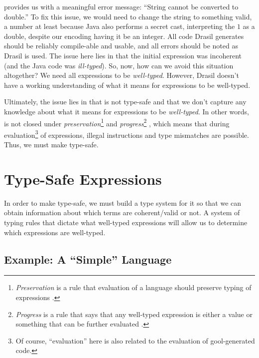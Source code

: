 \pseudoExampleLandPosQDBadTypingJavaCode{}

\pseudoExampleLandPosQDBadTypingJavaCodeCompErr{}

 provides us with a
meaningful error message: ``String cannot be converted to double.'' To fix this
issue, we would need to change the string to something valid, a number at least
because Java also performs a secret cast, interpreting the \(1\) as a double,
despite our encoding having it be an integer. All code Drasil generates should
be reliably compile-able and usable, and all errors should be noted as Drasil is
used. The issue here lies in that the initial expression was incoherent (and the
Java code was \textit{ill-typed}). So, now, how can we avoid this situation
altogether? We need all expressions to be \textit{well-typed}. However, Drasil
doesn't have a working understanding of what it means for expressions to be
well-typed.

Ultimately, the issue lies in that \Expr{} is not type-safe \cite{Harper2016}
and that we don't capture any knowledge about what it means for expressions to
be \textit{well-typed}. In other words, \Expr{} is not closed under
\textit{preservation}\footnote{\textit{Preservation} is a rule that evaluation
of a language should preserve typing of expressions \cite{Harper2016}.} and
\textit{progress}\footnote{\textit{Progress} is a rule that says that any
well-typed expression is either a value or something that can be further
evaluated \cite{Harper2016}.} \cite{Harper2016}, which means that during
evaluation\footnote{Of course, ``evaluation'' here is also related to the
evaluation of \acs{gool}-generated code.} of expressions, illegal instructions
and type mismatches are possible. Thus, we must make \Expr{} type-safe.

\section{Type-Safe Expressions}
\label{chap:typed-expr:sec:type-safe-expressions}

In order to make \Expr{} type-safe, we must build a type system for it so that
we can obtain information about which \Expr{} terms are coherent/valid or not. A
system of typing rules that dictate what well-typed expressions will allow us to
determine which expressions are well-typed.

\subsection{Example: A \textquotedblleft{}Simple\textquotedblright{} Language}
\label{chap:typed-expr:sec:type-safe-expressions:subsec:example-a-simple-language}

